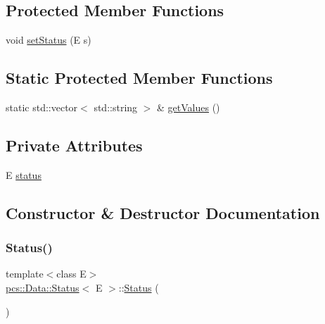 \subsection*{Protected Member Functions}
\begin{DoxyCompactItemize}
\item 
void \hyperlink{classpcs_1_1Data_1_1Status_acdcaf04de3ed0630d1e930d1ef43178d}{set\+Status} (E s)
\end{DoxyCompactItemize}
\subsection*{Static Protected Member Functions}
\begin{DoxyCompactItemize}
\item 
static std\+::vector$<$ std\+::string $>$ \& \hyperlink{classpcs_1_1Data_1_1Status_aca3f97a9ec38f17378a6c869fd6cf8ea}{get\+Values} ()
\end{DoxyCompactItemize}
\subsection*{Private Attributes}
\begin{DoxyCompactItemize}
\item 
E \hyperlink{classpcs_1_1Data_1_1Status_ac7e82c907984d7ad0e871e21d3631ab0}{status}
\end{DoxyCompactItemize}


\subsection{Constructor \& Destructor Documentation}
\mbox{\label{classpcs_1_1Data_1_1Status_a18ca779bdb37325922a8ecfac2918581}} 
\subsubsection{\texorpdfstring{Status()}{Status()}\hspace{0.1cm}{\footnotesize\ttfamily [1/2]}}
{\footnotesize\ttfamily template$<$class E$>$ \\
\hyperlink{classpcs_1_1Data_1_1Status}{pcs\+::\+Data\+::\+Status}$<$ E $>$\+::\hyperlink{classpcs_1_1Data_1_1Status}{Status} (\begin{DoxyParamCaption}{ }\end{DoxyParamCaption})\hspace{0.3cm}{\ttfamily [inline]}}

